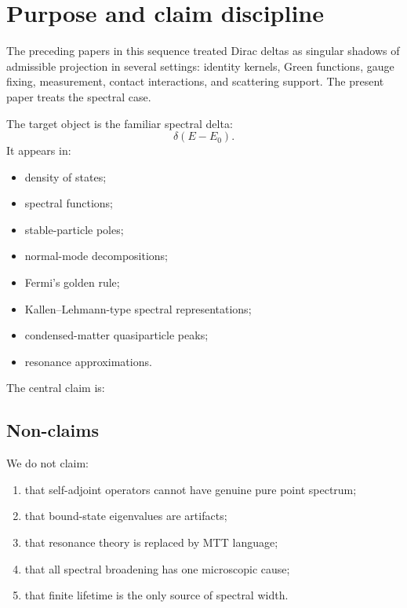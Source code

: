 \documentclass[11pt]{article}
\begin{document}
\seriestagline

\tableofcontents

\section{Purpose and claim discipline}

The preceding papers in this sequence treated Dirac deltas as singular shadows of admissible projection in several settings: identity kernels, Green functions, gauge fixing, measurement, contact interactions, and scattering support. The present paper treats the spectral case.

The target object is the familiar spectral delta:
\[
\delta(E-E_0).
\]
It appears in:
\begin{itemize}
\item density of states;
\item spectral functions;
\item stable-particle poles;
\item normal-mode decompositions;
\item Fermi's golden rule;
\item Kallen--Lehmann-type spectral representations;
\item condensed-matter quasiparticle peaks;
\item resonance approximations.
\end{itemize}

The central claim is:
\begin{center}
\end{center}

\subsection{Non-claims}

We do not claim:
\begin{enumerate}
\item that self-adjoint operators cannot have genuine pure point spectrum;
\item that bound-state eigenvalues are artifacts;
\item that resonance theory is replaced by MTT language;
\item that all spectral broadening has one microscopic cause;
\item that finite lifetime is the only source of spectral width.
\end{enumerate}
\end{document}
